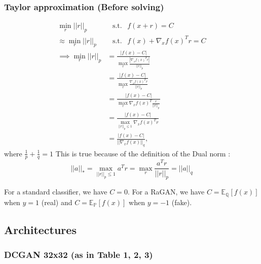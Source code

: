 \documentclass{article}
\begin{document}
\subsubsection{Taylor approximation (Before solving)}

\begin{align*}
\min_r || r ||_p& \hspace{5pt} \text{ s.t. } \hspace{5pt} f(x+r)=C \\
\approx \min_r || r ||_p& \hspace{5pt} \text{ s.t. } \hspace{5pt} f(x)+\nabla_x f(x)^T r=C \\
\implies \min_r || r ||_p& = \frac{|f(x)-C|}{\max_r \frac{|\nabla_x f(x)^T r|}{|| r ||_p}} \\ 
& = \frac{|f(x)-C|}{\max_r \frac{\nabla_x f(x)^T r}{|| r ||_p}} \\
& = \frac{|f(x)-C|}{\max_r \nabla_x f(x)^T \frac{r}{|| r ||_p}} \\ 
& = \frac{|f(x)-C|}{\max_{|| r ||_p \leq 1} \nabla_x f(x)^T r} \\ 
& = \frac{|f(x)-C|}{|| \nabla_x f(x) ||_q},
\end{align*}
where $\frac{1}{p} + \frac{1}{q} = 1$
This is true because of the definition of the Dual norm \citep{rudin1991functional}:
\[|| a ||_{*} = \max_{|| r ||_p \leq 1} a^T r = \max_r \frac{a^T r}{|| r ||_p} = ||a||_q\]

For a standard classifier, we have $C = 0$. For a RaGAN, we have $C= \mathbb{E}_{\mathbb{Q}}[f(x)]$ when $y=1$ (real) and $C= \mathbb{E}_{\mathbb{P}}[f(x)]$ when $y=-1$ (fake).

\subsection{Architectures}

\subsubsection{DCGAN 32x32 (as in Table 1, 2, 3)}
\end{document}
